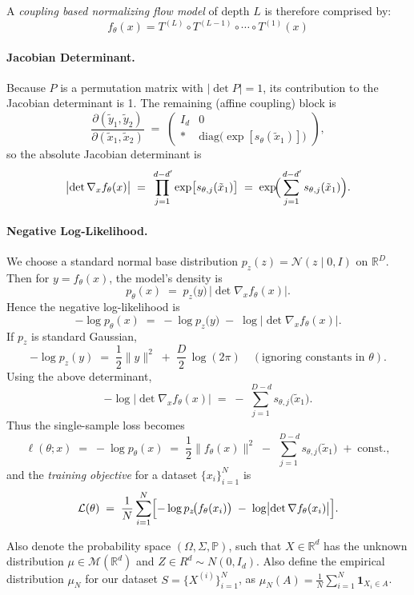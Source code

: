 \documentclass[11pt, a4paper]{article}
\theoremstyle{definition}
\theoremstyle{remark}
\newcommand{\R}{\mathbb{R}}
\newcommand{\Prob}{\mathbb{P}}
\begin{document}
	A \textit{coupling based normalizing flow model} of depth \(L\) is therefore comprised by:
	\[
	f_\theta (x) = T^{(L)} \circ  T^{(L-1)} \circ \cdots \circ  T^{(1)} (x) 
	 \]
	
	\paragraph{Jacobian Determinant.}
	Because $P$ is a permutation matrix with $\lvert \det P \rvert = 1$, its contribution to the Jacobian determinant is 1.
	The remaining (affine coupling) block is
	\[
	\frac{\partial (\tilde{y}_1, \tilde{y}_2)}{\partial (\tilde{x}_1, \tilde{x}_2)}
	\;=\;
	\begin{pmatrix}
		I_{d} & 0 \\
		* & \mathrm{diag}\!\bigl(\exp[s_\theta(\tilde{x}_1)]\bigr)
	\end{pmatrix},
	\]
	so the absolute Jacobian determinant is
	\[
	\bigl|\det \nabla_x f_\theta(x)\bigr|
	\;=\;
	\prod_{j=1}^{\,d-d'} \exp\bigl[s_{\theta,j}(\tilde{x}_1)\bigr]
	\;=\;
	\exp\!\Bigl(\sum_{j=1}^{\,d-d'} s_{\theta,j}(\tilde{x}_1)\Bigr).
	\]
	
	\paragraph{Negative Log-Likelihood.}
	We choose a standard normal base distribution $p_z(z) = \mathcal{N}(z \mid 0, I)$ on $\mathbb{R}^D$. 
	Then for $y = f_\theta(x)$, 
	the model's density is 
	\[
	p_\theta(x)
	\;=\;
	p_z\bigl(y\bigr)
	\,\bigl|\det \nabla_x f_\theta(x)\bigr|.
	\]
	Hence the negative log-likelihood is
	\[
	-\log p_\theta(x)
	\;=\;
	-\log p_z\!\bigl(y\bigr)
	\;-\; 
	\log \bigl|\det \nabla_x f_\theta(x)\bigr|.
	\]
	If $p_z$ is standard Gaussian, 
	\[
	-\log p_z(y)
	\;=\;
	\frac12 \|y\|^2 \;+\; \frac{D}{2}\,\log (2\pi)
	\quad (\text{ignoring constants in } \theta).
	\]
	Using the above determinant,
	\[
	-\log \bigl|\det \nabla_x f_\theta(x)\bigr|
	\;=\;
	-\,\sum_{j=1}^{\,D-d} s_{\theta,j}\!\bigl(\tilde{x}_1\bigr).
	\]
	Thus the single-sample loss becomes
	\[
	\ell(\theta; x)
	\;=\;
	-\log p_\theta(x)
	\;=\;
	\frac12 \|f_\theta(x)\|^2 
	\;-\;
	\sum_{j=1}^{\,D-d} s_{\theta,j}\!\bigl(\tilde{x}_1\bigr)
	\;+\;
	\text{const.},
	\]
	and the \emph{training objective} for a dataset $\{x_i\}_{i=1}^N$ is 
	\[
	\mathcal{L}(\theta)
	\;=\;
	\frac{1}{N} \sum_{i=1}^N
	\Bigl[
	- \log p_z\!\bigl(f_\theta(x_i)\bigr)
	\;-\;
	\log \bigl|\det \nabla f_\theta(x_i)\bigr|
	\Bigr].
	\]
	
	
	Also denote the probability space \((\Omega,\Sigma,\Prob)\), such that \(X \in \R^d\) has the unknown distribution \(\mu \in \mathcal{M}(\R^d)\) and \(Z \in R^d \sim N(0,I_d)\). Also define the empirical distribution \(\mu_N\) for our dataset \(S=\{X^{(i)}\}_{i=1}^N\), as \(\mu_N(A) = \frac{1}{N}\sum_{i=1}^{N} \mathbf{1}_{X_i \in A}\).
	
\end{document}
